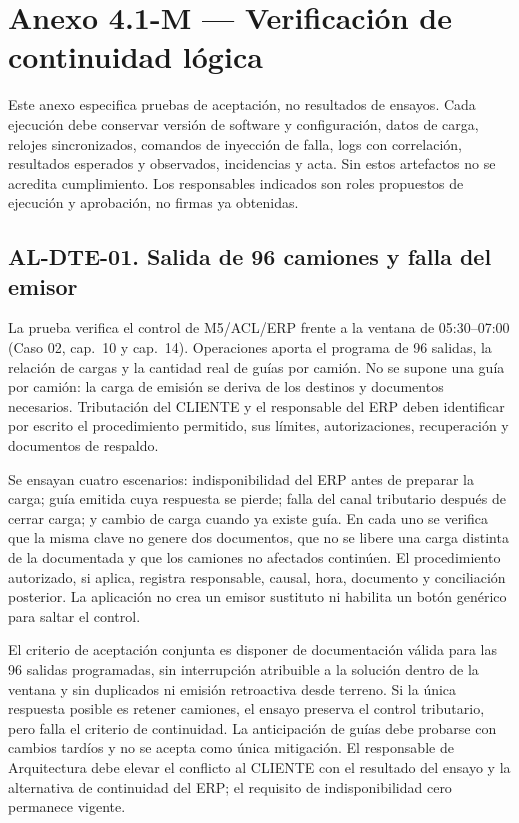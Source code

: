 \section*{Anexo 4.1-M --- Verificación de continuidad lógica}
\label{anx:M}
Este anexo especifica pruebas de aceptación, no resultados de ensayos. Cada ejecución debe conservar versión de software y configuración, datos de carga, relojes sincronizados, comandos de inyección de falla, logs con correlación, resultados esperados y observados, incidencias y acta. Sin estos artefactos no se acredita cumplimiento. Los responsables indicados son roles propuestos de ejecución y aprobación, no firmas ya obtenidas.

\subsection*{AL-DTE-01. Salida de 96 camiones y falla del emisor}
La prueba verifica el control de M5/ACL/ERP frente a la ventana de 05:30--07:00 (Caso 02, cap.~10 y cap.~14). Operaciones aporta el programa de 96 salidas, la relación de cargas y la cantidad real de guías por camión. No se supone una guía por camión: la carga de emisión se deriva de los destinos y documentos necesarios. Tributación del CLIENTE y el responsable del ERP deben identificar por escrito el procedimiento permitido, sus límites, autorizaciones, recuperación y documentos de respaldo.

Se ensayan cuatro escenarios: indisponibilidad del ERP antes de preparar la carga; guía emitida cuya respuesta se pierde; falla del canal tributario después de cerrar carga; y cambio de carga cuando ya existe guía. En cada uno se verifica que la misma clave no genere dos documentos, que no se libere una carga distinta de la documentada y que los camiones no afectados continúen. El procedimiento autorizado, si aplica, registra responsable, causal, hora, documento y conciliación posterior. La aplicación no crea un emisor sustituto ni habilita un botón genérico para saltar el control.

El criterio de aceptación conjunta es disponer de documentación válida para las 96 salidas programadas, sin interrupción atribuible a la solución dentro de la ventana y sin duplicados ni emisión retroactiva desde terreno. Si la única respuesta posible es retener camiones, el ensayo preserva el control tributario, pero falla el criterio de continuidad. La anticipación de guías debe probarse con cambios tardíos y no se acepta como única mitigación. El responsable de Arquitectura debe elevar el conflicto al CLIENTE con el resultado del ensayo y la alternativa de continuidad del ERP; el requisito de indisponibilidad cero permanece vigente.

